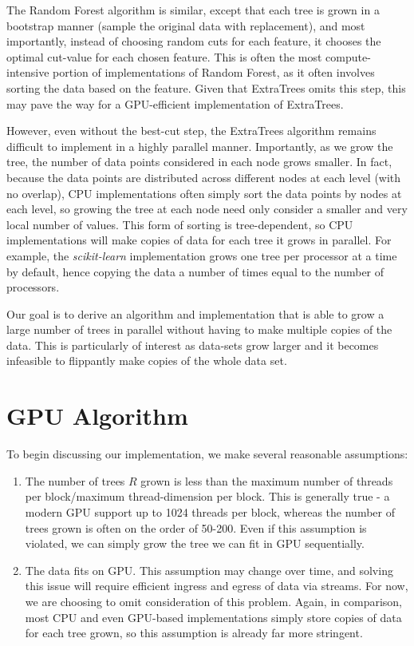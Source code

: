 \documentclass[10pt,conference]{IEEEtran}
\begin{document}
  The Random Forest algorithm is similar, except that each tree is grown in a bootstrap manner (sample the original data with replacement), and most importantly, instead of choosing random cuts for each feature, it chooses the optimal cut-value for each chosen feature. This is often the most compute-intensive portion of implementations of Random Forest, as it often involves sorting the data based on the feature. Given that ExtraTrees omits this step, this may pave the way for a GPU-efficient implementation of ExtraTrees.
  
  However, even without the best-cut step, the ExtraTrees algorithm remains difficult to implement in a highly parallel manner. Importantly, as we grow the tree, the number of data points considered in each node grows smaller. In fact, because the data points are distributed across different nodes at each level (with no overlap), CPU implementations often simply sort the data points by nodes at each level, so growing the tree at each node need only consider a smaller and very local number of values. This form of sorting is tree-dependent, so CPU implementations will make copies of data for each tree it grows in parallel. For example, the \textit{scikit-learn} implementation grows one tree per processor at a time by default, hence copying the data a number of times equal to the number of processors.
  
  Our goal is to derive an algorithm and implementation that is able to grow a large number of trees in parallel without having to make multiple copies of the data. This is particularly of interest as data-sets grow larger and it becomes infeasible to flippantly make copies of the whole data set.

\section{GPU Algorithm}

  To begin discussing our implementation, we make several reasonable assumptions:
  
  \begin{enumerate}
    \item The number of trees $R$ grown is less than the maximum number of threads per block/maximum thread-dimension per block. This is generally true - a modern GPU support up to 1024 threads per block, whereas the number of trees grown is often on the order of 50-200. Even if this assumption is violated, we can simply grow the tree we can fit in GPU sequentially.
    \item The data fits on GPU. This assumption may change over time, and solving this issue will require efficient ingress and egress of data via streams. For now, we are choosing to omit consideration of this problem. Again, in comparison, most CPU and even GPU-based implementations simply store copies of data for each tree grown, so this assumption is already far more stringent.
  \end{enumerate}
  
\end{document}
